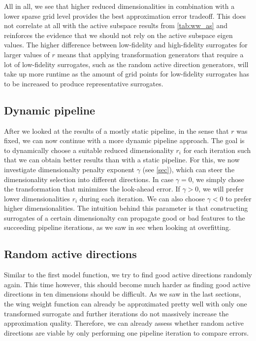 \documentclass[
  a4paper,  %
  twoside,  %
  bibliography=totoc,
  headsepline,
  cleardoublepage=empty,
  parskip=half,
  draft=false
]{scrbook}
\begin{document}
All in all, we see that higher reduced dimensionalities in combination with a lower sparse grid level provides the best approximation error tradeoff.
This does not correlate at all with the active subspace results from \cref{tab:ww_as} and reinforces the evidence that we should not rely on the active subspace eigen values.
The higher difference between low-fidelity and high-fidelity surrogates for larger values of $r$ means that applying transformation generators that require a lot of low-fidelity surrogates, such as the random active direction generators, will take up more runtime as the amount of grid points for low-fidelity surrogates has to be increased to produce representative surrogates.

\subsection{Dynamic pipeline}

After we looked at the results of a mostly static pipeline, in the sense that $r$ was fixed, we can now continue with a more dynamic pipeline approach.
The goal is to dynamically choose a suitable reduced dimensionality $r_i$ for each iteration such that we can obtain better results than with a static pipeline.
For this, we now investigate dimensionalty penalty exponent $\gamma$ (see \cref{sec}), which can steer the dimensionality selection into different directions.
In case $\gamma=0$, we simply chose the transformation that minimizes the look-ahead error.
If $\gamma > 0$, we will prefer lower dimensionalities $r_i$ during each iteration.
We can also choose $\gamma < 0$ to prefer higher dimensionalities.
The intuition behind this parameter is that constructing surrogates of a certain dimensionalty can propagate good or bad features to the succeeding pipeline iterations, as we saw in sec when looking at overfitting.

\subsection{Random active directions}

Similar to the first model function, we try to find good active directions randomly again.
This time however, this should become much harder as finding good active directions in ten dimensions should be difficult.
As we saw in the last sections, the wing weight function can already be approximated pretty well with only one transformed surrogate and further iterations do not massively increase the approximation quality.
Therefore, we can already assess whether random active directions are viable by only performing one pipeline iteration to compare errors.
\end{document}
